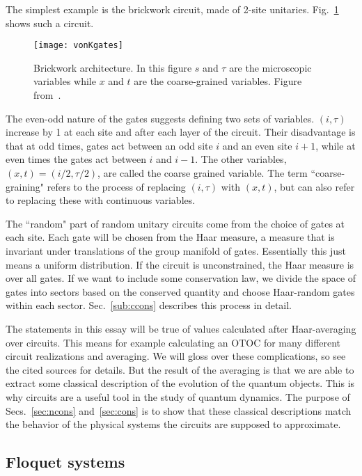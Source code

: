 \documentclass[a4paper,11pt]{article}
\renewcommand{\t}{\tau}
\begin{document}
The simplest example is the brickwork circuit, made of 2-site unitaries. Fig.~\ref{fig:vonKgates} shows such a circuit.
\begin{figure}
	\centering
	\texttt{[image: vonKgates]}
	\caption{Brickwork architecture. In this figure $s$ and $\tau$ are the microscopic variables while $x$ and $t$ are the coarse-grained variables. Figure from~\cite{vonKeyserlingkHydro}.}
	\label{fig:vonKgates}
\end{figure}
The even-odd nature of the gates suggests defining two sets of variables. $(i,\t)$ increase by 1 at each site and after each layer of the circuit. 
Their disadvantage is that at odd times, gates act between an odd site $i$ and an even site $i+1$, while at even times the gates act between $i$ and $i-1$.
The other variables, $(x,t) = (i/2,\t/2)$, are called the coarse grained variable.
The term ``coarse-graining" refers to the process of replacing $(i,\t)$ with $(x,t)$, but can also refer to replacing these with continuous variables.

The ``random" part of random unitary circuits come from the choice of gates at each site. Each gate will be chosen from the Haar measure, a measure that is invariant under translations of the group manifold of gates. Essentially this just means a uniform distribution. If the circuit is unconstrained, the Haar measure is over all gates. If we want to include some conservation law, we divide the space of gates into sectors based on the conserved quantity and choose Haar-random gates within each sector. Sec.~\ref{sub:ccons} describes this process in detail.

The statements in this essay will be true of values calculated after Haar-averaging over circuits. This means for example calculating an OTOC for many different circuit realizations and averaging. We will gloss over these complications, so see the cited sources for details. But the result of the averaging is that we are able to extract some classical description of the evolution of the quantum objects. This is why circuits are a useful tool in the study of quantum dynamics. The purpose of Secs.~\ref{sec:ncons} and~\ref{sec:cons} is to show that these classical descriptions match the behavior of the physical systems the circuits are supposed to approximate.

\subsection{Floquet systems} \label{sub:floq}
\end{document}
